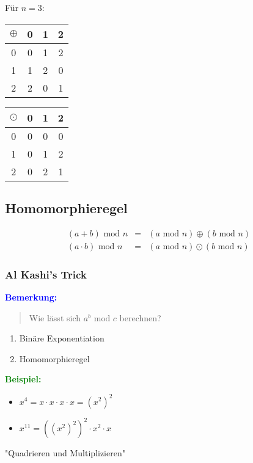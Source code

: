 \documentclass{article}
\newcommand{\blue}[1]{\textcolor{blue}{#1}}
\newcommand{\green}[1]{\textcolor{green}{#1}}
\newcommand{\ex}{\green{\textbf{Beispiel: }}}
\newcommand{\an}[1]{\blue{\textbf{Bemerkung: }}\begin{quote}#1\end{quote}}
\renewcommand{\mod}{\text{ mod }}
\begin{document}
Für $n = 3$:
\begin{center}
    \begin{minipage}{3.7cm}
        \begin{tabular}{c|c|c|c}
            $\oplus$ & 0 & 1 & 2\\
            \hline
            0 & 0 & 1 & 2\\
            1 & 1 & 2 & 0\\
            2 & 2 & 0 & 1
        \end{tabular}
    \end{minipage}
    \begin{minipage}{2.7cm}
        \begin{tabular}{c|c|c|c}
            $\odot$ & 0 & 1 & 2\\
            \hline
            0 & 0 & 0 & 0\\
            1 & 0 & 1 & 2\\
            2 & 0 & 2 & 1
        \end{tabular}
    \end{minipage}
\end{center}

\subsection{Homomorphieregel}

\[
    \begin{array}{lcl}
        (a + b) \mod n &=& (a \mod n) \oplus (b \mod n)\\
        (a \cdot b) \mod n &=& (a \mod n) \odot (b \mod n)
    \end{array}
\]

\subsubsection{Al Kashi's Trick}

\an{Wie lässt sich $a^b \mod c$ berechnen?}
\begin{enumerate}
    \item Binäre Exponentiation
    \item Homomorphieregel
\end{enumerate}
\ex \begin{itemize}
    \item $x^4 = x \cdot x \cdot x \cdot x = (x^2)^2$
    \item $x^{11} = \left( \left( x^2 \right)^2 \right)^2 \cdot x^2 \cdot x$
\end{itemize}
"Quadrieren und Multiplizieren"
\end{document}
